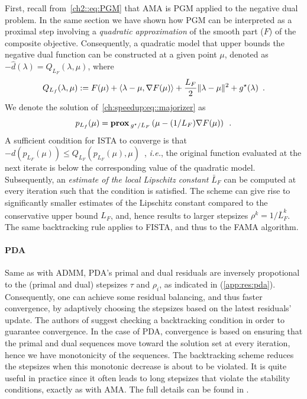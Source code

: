 \documentclass[openany]{now}
\newcommand{\ie}{{\it i.e.}}
\newcommand{\prox}{\mathop{\bf prox}}
\begin{document}
First, recall from~\eqref{ch2::eq:PGM} that AMA is PGM applied to the negative dual problem. In the same section we have shown how PGM can be interpreted as a proximal step involving a \emph{quadratic approximation} of the smooth part ($F$) of the composite objective. Consequently, a quadratic model that upper bounds the negative dual function can be constructed at a given point $\mu$, denoted as $-\hat{d}(\lambda) = Q_{L_F}(\lambda,\mu)$, where
\begin{equation}{\label{ch:speedup:eq::majorizer}}
Q_{L_f}(\lambda,\mu) := F(\mu) + \langle \lambda-\mu,\nabla F(\mu)\rangle + \frac{L_F}{2}\|\lambda-\mu\|^2 + g^\star(\lambda) \enspace.
\end{equation}
We denote the solution of~\eqref{ch:speedup:eq::majorizer} as
\[
 p_{L_f}(\mu) = \prox{_{g^\star/{L_F}}}\left(\mu-(1/L_F)\nabla F(\mu)\right)\enspace.
\]
A sufficient condition for ISTA to converge is that $-d(p_{L_F}(\mu))\le Q_{L_F}(p_{L_F}(\mu),\mu)$~\cite[Lemma~2.3]{fista}, \ie, the original function evaluated at the next iterate is below the corresponding value of the quadratic model. Subsequently, an \emph{estimate of the local Lipschitz constant} $\bar{L}_F$ can be computed at every iteration such that the condition is satisfied. The scheme can give rise to significantly smaller estimates of the Lipschitz constant compared to the conservative upper bound $L_F$, and, hence results to larger stepsizes $\rho^k=1/\bar{L}_F^k$. The same backtracking rule applies to FISTA, and thus to the FAMA algorithm.

\paragraph*{PDA} Same as with ADMM, PDA's primal and dual residuals are inversely propotional to the (primal and dual) stepsizes $\tau$ and $\rho_i$, as indicated in (\ref{app:res:pda}). Consequently, one can achieve some residual balancing, and thus faster convergence, by adaptively choosing the stepsizes based on the latest residuals' update. The authors of \cite{goldstein2013adaptive} suggest checking a backtracking condition in order to guarantee convergence. In the case of PDA, convergence is based on ensuring that the primal and dual sequences move toward the solution set at every iteration, hence we have monotonicity of the sequences. The backtracking scheme reduces the stepsizes when this monotonic decrease is about to be violated. It is quite useful in practice since it often leads to long stepsizes that violate the stability conditions, exactly as with AMA. The full details can be found in \cite{goldstein2013adaptive}. 
\end{document}
